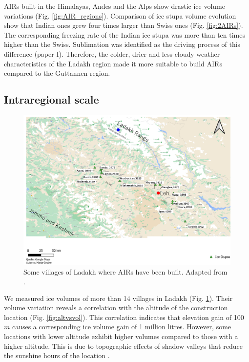 AIRs built in the Himalayas, Andes and the Alps show drastic ice volume variations (Fig. \ref{fig:AIR_regions}).
Comparison of ice stupa volume evolution show that Indian ones grew four times larger than Swiss ones (Fig.
\ref{fig:2AIRs}). The corresponding freezing rate of the Indian ice stupa was more than ten times higher than
the Swiss. Sublimation was identified as the driving process of this difference (paper I). Therefore, the
colder, drier and less cloudy weather characteristics of the Ladakh region made it more suitable to build AIRs
compared to the Guttannen region. 

\subsection{Intraregional scale}

\begin{figure}[htb]
	\includegraphics[width=\textwidth]{figs/ISC_villages}
  \caption{Some villages of Ladakh where AIRs have been built. Adapted from
  \citet{mariagruberIceStupasLadakh2022}.}
	\label{fig:villages}
\end{figure}

We measured ice volumes of more than 14 villages in Ladakh (Fig. \ref{fig:villages}). Their volume variation
reveals a correlation with the altitude of the construction location (Fig. \ref{fig:altvsvol}). This correlation
indicates that elevation gain of 100 $m$ causes a corresponding ice volume gain of 1 million litres. However,
some locations with lower altitude exhibit higher volumes compared to those with a higher altitude. This is due
to topographic effects of shadow valleys that reduce the sunshine hours of the location
\citep{mariagruberIceStupasLadakh2022}.

